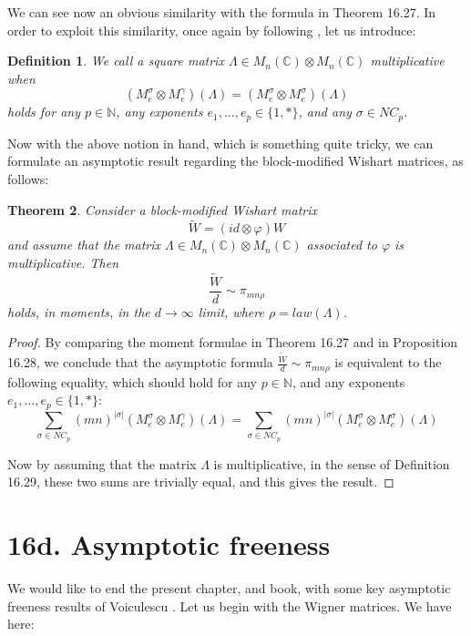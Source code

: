 \documentclass[12pt]{amsbook}
\newtheorem{theorem}{Theorem}[chapter]
\newtheorem{definition}[theorem]{Definition}
\begin{document}
We can see now an obvious similarity with the formula in Theorem 16.27. In order to exploit this similarity, once again by following \cite{bne}, let us introduce:


\begin{definition}
We call a square matrix $\Lambda\in M_n(\mathbb C)\otimes M_n(\mathbb C)$ multiplicative when
$$(M^\sigma_e\otimes M^\gamma_e)(\Lambda)=(M^\sigma_e\otimes M^\sigma_e)(\Lambda)$$
holds for any $p\in\mathbb N$, any exponents $e_1,\ldots,e_p\in\{1,*\}$, and any $\sigma\in NC_p$.
\end{definition}

Now with the above notion in hand, which is something quite tricky, we can formulate an asymptotic result regarding the block-modified Wishart matrices, as follows:

\begin{theorem}
Consider a block-modified Wishart matrix 
$$\widetilde{W}=(id\otimes\varphi)W$$
and assume that the matrix $\Lambda\in M_n(\mathbb C)\otimes M_n(\mathbb C)$ associated to $\varphi$ is multiplicative. Then
$$\frac{\widetilde{W}}{d}\sim\pi_{mn\rho}$$
holds, in moments, in the $d\to\infty$ limit, where $\rho=law(\Lambda)$.
\end{theorem}

\begin{proof}
By comparing the moment formulae in Theorem 16.27 and in Proposition 16.28, we conclude that the asymptotic formula $\frac{\widetilde{W}}{d}\sim\pi_{mn\rho}$ is equivalent to the following equality, which should hold for any $p\in\mathbb N$, and any exponents $e_1,\ldots,e_p\in\{1,*\}$:
$$\sum_{\sigma\in NC_p}(mn)^{|\sigma|}(M^\sigma_e\otimes M^\gamma_e)(\Lambda)=\sum_{\sigma\in NC_p}(mn)^{|\sigma|}(M^\sigma_e\otimes M^\sigma_e)(\Lambda)$$

Now by assuming that the matrix $\Lambda$ is multiplicative, in the sense of Definition 16.29, these two sums are trivially equal, and this gives the result.
\end{proof}

\section*{16d. Asymptotic freeness}

We would like to end the present chapter, and book, with some key asymptotic freeness results of Voiculescu \cite{vdn}. Let us begin with the Wigner matrices. We have here:
\end{document}

